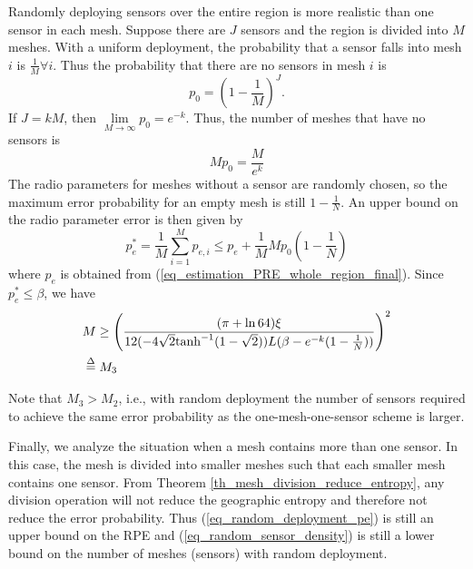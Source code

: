 \documentclass[conference]{IEEEtran}
\begin{document}
Randomly deploying sensors over the entire region is more realistic than one sensor in each mesh.
Suppose there are $J$ sensors and the region is divided into $M$ meshes.
With a uniform deployment, the probability that a sensor falls into mesh $i$ is $\frac{1}{M} \forall i$.
Thus the probability that there are no sensors in mesh $i$ is
\begin{equation}
{p_0} = {\left( {1 - \frac{1}{M}} \right)^J}.
\end{equation}
If $J = kM$, then $\mathop {\lim }\limits_{M \to \infty } {p_0} = {e^{ - k}}$.
Thus, the number of meshes that have no sensors is
\begin{equation}\label{eq_vacant_meshes}
M{p_0} = \frac{M}{{{e^k}}}
\end{equation}
The radio parameters for meshes without a sensor are randomly chosen, so
the maximum error probability for an empty mesh is still ${1 - \frac{1}{N}}$.
An upper bound on the radio parameter error is then given by
\begin{equation}\label{eq_random_deployment_pe}
p_e^* = \frac{1}{M}\sum\limits_{i = 1}^M {{p_{e,i}}}  \le {p_e} + \frac{1}{M}M{p_0}\left( {1 - \frac{1}{N}} \right)
\end{equation}
where $p_e$ is obtained from (\ref{eq_estimation_PRE_whole_region_final}).
Since $p_e^* \le \beta$, we have
\begin{equation}\label{eq_random_sensor_density}
\begin{aligned}
& M \ge {\left( {\frac{{(\pi  + \ln 64)\xi }}{{12( { - 4\sqrt 2 {{\tanh }^{ - 1}}(1 - \sqrt 2 )} )L( {\beta  - {e^{ - k}}( {1 - \frac{1}{N}} )} )}}} \right)^2}\\
& \buildrel \Delta \over = {M_3}
\end{aligned}
\end{equation}

Note that $M_3 > M_2$, i.e., with random deployment the number of sensors required to achieve the same error probability as
the one-mesh-one-sensor scheme is larger.

Finally, we analyze the situation when a mesh contains more than one sensor.
In this case, the mesh is divided into smaller meshes such that each smaller mesh contains one sensor.
From Theorem \ref{th_mesh_division_reduce_entropy}, any division operation will not reduce the geographic entropy and therefore not reduce the error probability.
Thus (\ref{eq_random_deployment_pe}) is still an upper bound on the RPE and (\ref{eq_random_sensor_density}) is still a lower bound on the number of meshes (sensors)
with random deployment.
\end{document}

